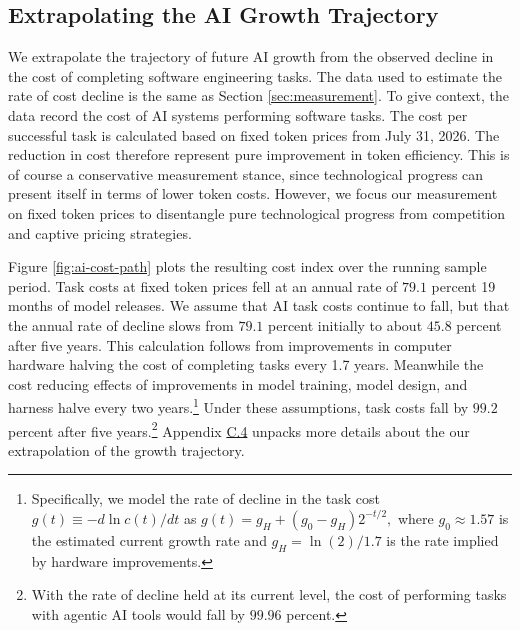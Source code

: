 \documentclass[11pt]{article}
\begin{document}
\subsection{Extrapolating the AI Growth Trajectory}

We extrapolate the trajectory of future AI growth from the observed
decline in the cost of completing software engineering tasks. The
data used to estimate the rate of cost decline is the same as Section
\ref{sec:measurement}. To give context, the data record the cost
of AI systems performing software tasks. The cost per successful task
is calculated based on fixed token prices from July 31, 2026. The
reduction in cost therefore represent pure improvement in token efficiency.
This is of course a conservative measurement stance, since technological
progress can present itself in terms of lower token costs. However,
we focus our measurement on fixed token prices to disentangle pure
technological progress from competition and captive pricing strategies.

Figure \ref{fig:ai-cost-path} plots the resulting cost index over
the running sample period. Task costs at fixed token prices fell at
an annual rate of $79.1$ percent 19 months of
model releases. We assume that AI task costs continue to fall, but
that the annual rate of decline slows from $79.1$
percent initially to about $45.8$
percent after five years. This calculation follows from improvements
in computer hardware halving the cost of completing tasks every 1.7
years. Meanwhile the cost reducing effects of improvements in model
training, model design, and harness halve every two years.\footnote{Specifically, we model the rate of decline in the task cost $g(t)\equiv-d\ln c(t)/dt$
as $g(t)=g_{H}+(g_{0}-g_{H})2^{-t/2},$ where $g_{0}\approx1.57$
is the estimated current growth rate and $g_{H}=\ln(2)/1.7$ is the
rate implied by hardware improvements.} Under these assumptions, task costs fall by $99.2$
percent after five years.\footnote{With the rate of decline held at its current level, the cost of performing
tasks with agentic AI tools would fall by $99.96$
percent.} Appendix \href{https://ahmadlp.github.io/Lashkaripour_AI_Displacement_Online_Appendix.pdf\#page=85}{C.4} unpacks more details about
the our extrapolation of the growth trajectory.
\end{document}
